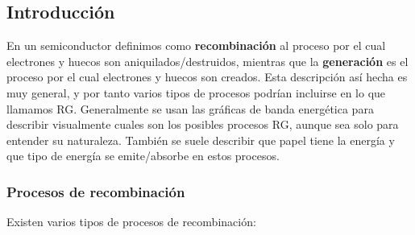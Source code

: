 \subsection{Introducción}

En un semiconductor definimos como \textbf{recombinación} al proceso por el cual electrones y huecos son aniquilados/destruidos, mientras que la \textbf{generación} es el proceso por el cual electrones y huecos son creados. Esta descripción así hecha es muy general, y por tanto varios tipos de procesos podrían incluirse en lo que llamamos RG. Generalmente se usan las gráficas de banda energética para describir visualmente cuales son los posibles procesos RG, aunque sea solo para entender su naturaleza. También se suele describir que papel tiene la energía y que tipo de energía se emite/absorbe en estos procesos.

\subsubsection{Procesos de recombinación}

Existen varios tipos de procesos de recombinación:


